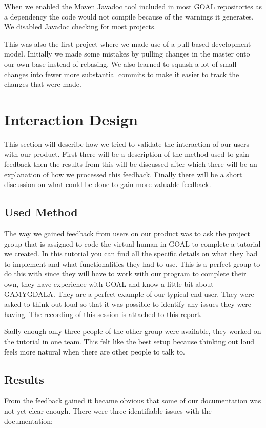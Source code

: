 \documentclass[11pt]{article}
\begin{document}
When we enabled the Maven Javadoc tool included in most GOAL repositories as a dependency the code would not compile because of the warnings it generates. We disabled Javadoc checking for most projects.\par
This was also the first project where we made use of a pull-based development model. Initially we made some mistakes by pulling changes in the master onto our own base instead of rebasing. We also learned to squash a lot of small changes into fewer more substantial commits to make it easier to track the changes that were made. 
\clearpage

\section{Interaction Design}
This section will describe how we tried to validate the interaction of our users with our product. First there will be a description of the method used to gain feedback then the results from this will be discussed after which there will be an explanation of how we processed this feedback. Finally there will be a short discussion on what could be done to gain more valuable feedback.

\subsection{Used Method}
The way we gained feedback from users on our product was to ask the project group that is assigned to code the virtual human in GOAL to complete a tutorial\cite{tutorial} we created. In this tutorial you can find all the specific details on what they had to implement and what functionalities they had to use. This is a perfect group to do this with since they will have to work with our program to complete their own, they have experience with GOAL and know a little bit about \gls{GAMYGDALA}\cite{GAMYGDALA}. They are a perfect example of our typical end user. They were asked to think out loud so that it was possible to identify any issues they were having. The recording of this session is attached to this report.

Sadly enough only three people of the other group were available, they worked on the tutorial in one team. This felt like the best setup because thinking out loud feels more natural when there are other people to talk to.

\subsection{Results}
From the feedback gained it became obvious that some of our documentation was not yet clear enough. There were three identifiable issues with the documentation:
\end{document}
